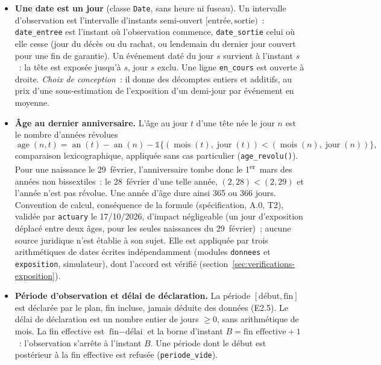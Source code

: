 \documentclass[a4paper,11pt]{article}
\newcommand{\code}[1]{\texttt{\small #1}}
\begin{document}
\begin{itemize}[leftmargin=*, itemsep=2pt]
  \item \textbf{Une date est un jour} (classe \code{Date}, sans heure ni fuseau).
    Un intervalle d'observation est l'intervalle d'instants semi-ouvert
    $[\text{entrée}, \text{sortie})$~: \code{date\_entree} est l'instant où
    l'observation commence, \code{date\_sortie} celui où elle cesse (jour du
    décès ou du rachat, ou lendemain du dernier jour couvert pour une fin de
    garantie). Un événement daté du jour $s$ survient à l'instant $s$~: la tête
    est exposée jusqu'à $s$, jour $s$ exclu. Une ligne \code{en\_cours} est
    ouverte à droite. \emph{Choix de conception}~: il donne des décomptes
    entiers et additifs, au prix d'une sous-estimation de l'exposition d'un
    demi-jour par événement en moyenne.
  \item \textbf{Âge au dernier anniversaire.} L'âge au jour $t$ d'une tête née
    le jour $n$ est le nombre d'années révolues
    \[
      \operatorname{age}(n,t) = \operatorname{an}(t) - \operatorname{an}(n)
      - \mathds{1}\{(\operatorname{mois}(t), \operatorname{jour}(t)) <
      (\operatorname{mois}(n), \operatorname{jour}(n))\},
    \]
    comparaison lexicographique, appliquée sans cas particulier
    (\code{age\_revolu()}). Pour une naissance le 29~février, l'anniversaire
    tombe donc le 1\textsuperscript{er}~mars des années non bissextiles~: le
    28~février d'une telle année, $(2, 28) < (2, 29)$ et l'année n'est pas
    révolue. Une année d'âge dure ainsi 365 ou 366 jours. Convention de
    calcul, conséquence de la formule (spécification, A.0, T2), validée par
    \code{actuary} le 17/10/2026, d'impact négligeable (un jour d'exposition
    déplacé entre deux âges, pour les seules naissances du 29~février)~;
    aucune source juridique n'est établie à son sujet. Elle est appliquée
    par trois arithmétiques de dates écrites indépendamment (modules
    \code{donnees} et \code{exposition}, simulateur), dont l'accord est
    vérifié (section~\ref{sec:verifications-exposition}).
  \item \textbf{Période d'observation et délai de déclaration.} La période
    $[\text{début}, \text{fin}]$ est déclarée par le plan, fin incluse, jamais
    déduite des données (E2.5). Le délai de déclaration est un nombre entier
    de jours $\ge 0$, sans arithmétique de mois. La fin effective est
    $\text{fin} - \text{délai}$ et la borne d'instant
    $B = \text{fin effective} + 1$~: l'observation s'arrête à l'instant $B$. Une
    période dont le début est postérieur à la fin effective est refusée
    (\code{periode\_vide}).
\end{itemize}
\end{document}
